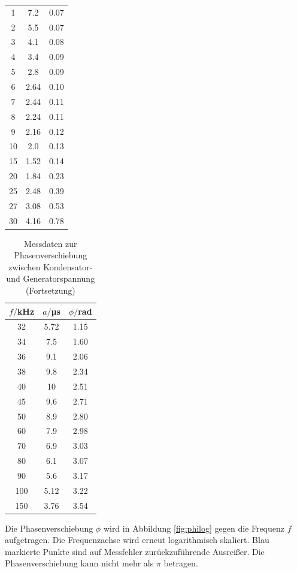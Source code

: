 \begin{table}
\begin{tabular}{c c c}
 1	   &    7.2  & 0.07 \\
 2	   &    5.5  & 0.07 \\
 3	   &    4.1  & 0.08 \\
 4	   &    3.4  & 0.09 \\
 5	   &    2.8  & 0.09 \\
 6	   &    2.64 & 0.10 \\
 7	   &    2.44 & 0.11 \\
 8	   &    2.24 & 0.11 \\
 9	   &    2.16 & 0.12 \\
10	   &    2.0  & 0.13 \\
15	   &    1.52 & 0.14 \\
20	   &    1.84 & 0.23 \\
25	   &    2.48 & 0.39 \\
27	   &    3.08 & 0.53 \\
30	   &    4.16 & 0.78 \\
\bottomrule
\end{tabular}
\end{table}

\begin{table}
\centering
\caption{Messdaten zur Phasenverschiebung zwischen Kondensator- und Generatorspannung (Fortsetzung)}
\label{tab:phase2}
\begin{tabular}{c c c}
\toprule
$f/$kHz & $a/$µs & $\phi/$rad \\
\midrule
32	& 5.72 & 1.15 \\
34	& 7.5  & 1.60 \\
36	& 9.1  & 2.06 \\
38	& 9.8  & 2.34 \\
40	& 10   & 2.51 \\
45	& 9.6  & 2.71 \\
50	& 8.9  & 2.80 \\
60	& 7.9  & 2.98 \\
70	& 6.9  & 3.03 \\
80	& 6.1  & 3.07 \\
90	& 5.6  & 3.17 \\
100 & 5.12 & 3.22 \\
150 & 3.76 & 3.54 \\
\bottomrule
\end{tabular}
\end{table}

Die Phasenverschiebung $\phi$ wird in Abbildung \ref{fig:philog} gegen die Frequenz
$f$ aufgetragen. Die Frequenzachse wird erneut logarithmisch skaliert. Blau markierte
Punkte sind auf Messfehler zurückzuführende Ausreißer. Die Phasenverschiebung kann
nicht mehr als $\pi$ betragen.

